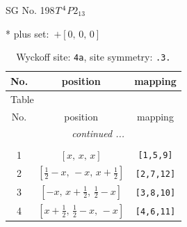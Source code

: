 \documentclass[fleqn,8pt]{jsarticle}
\begin{document}
\setcounter{MaxMatrixCols}{32}

\renewcommand{\tablename}{Table~}
\renewcommand{\figurename}{Figure~}
\begin{center}
\LARGE
SG No. 198\quad$T_{\rm }^{4}$\quad$P2_13$\quad[ cubic ]
\end{center}
* plus set:\,\,\,$+\left[ 0,\, 0,\, 0 \right]$
\renewcommand{\arraystretch}{1.2}
\begin{longtable}{ccc}
\caption{Wyckoff site: {\tt 4a}, site symmetry: {\tt .3.}}
 \\
 \hline \hline
No. & position & mapping \\ \hline \endfirsthead

\multicolumn{2}{l}{\tablename\ \thetable{}} \\
 \hline \hline
No. & position & mapping \\ \hline \endhead

 \hline \hline
\multicolumn{2}{r}{\footnotesize\it continued ...} \\ \endfoot

 \hline \hline
\multicolumn{2}{r}{} \\ \endlastfoot

1 & $\left[ x,\, x,\, x \right]$ & {\tt [1,5,9]} \\ \hline
2 & $\left[ \frac{1}{2} - x,\, - x,\, x + \frac{1}{2} \right]$ & {\tt [2,7,12]} \\ \hline
3 & $\left[ - x,\, x + \frac{1}{2},\, \frac{1}{2} - x \right]$ & {\tt [3,8,10]} \\ \hline
4 & $\left[ x + \frac{1}{2},\, \frac{1}{2} - x,\, - x \right]$ & {\tt [4,6,11]} \\
\end{longtable}
\renewcommand{\arraystretch}{1.2}
\end{document}
